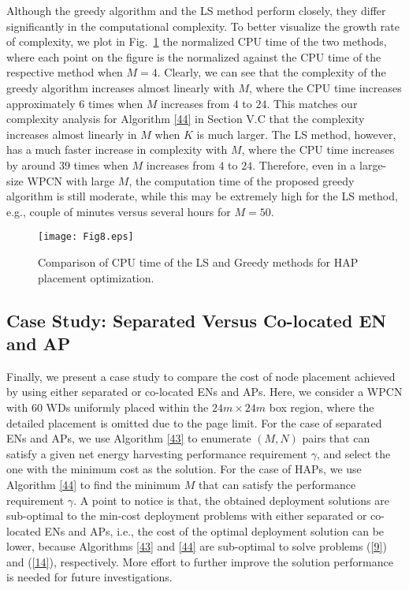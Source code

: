 \documentclass[journal, draftcls, one column, 12pt]{IEEEtran}
\begin{document}
Although the greedy algorithm and the LS method perform closely, they differ significantly in the computational complexity. To better visualize the growth rate of complexity, we plot in Fig.~\ref{70} the normalized CPU time of the two methods, where each point on the figure is the normalized against the CPU time of the respective method when $M=4$. Clearly, we can see that the complexity of the greedy algorithm increases almost linearly with $M$, where the CPU time increases approximately $6$ times when $M$ increases from $4$ to $24$. This matches our complexity analysis for Algorithm \ref{44} in Section V.C that the complexity increases almost linearly in $M$ when $K$ is much larger. The LS method, however, has a much faster increase in complexity with $M$, where the CPU time increases by around $39$ times when $M$ increases from $4$ to $24$. Therefore, even in a large-size WPCN with large $M$, the computation time of the proposed greedy algorithm is still moderate, while this may be extremely high for the LS method, e.g., couple of minutes versus several hours for $M =50$.

\begin{figure}
\centering
  \begin{center}
    \texttt{[image: Fig8.eps]}
  \end{center}
  \caption{Comparison of CPU time of the LS and Greedy methods for HAP placement optimization.}
  \label{70}
\end{figure}

\subsection{Case Study: Separated Versus Co-located EN and AP}
Finally, we present a case study to compare the cost of node placement achieved by using either separated or co-located ENs and APs. Here, we consider a WPCN with $60$ WDs uniformly placed within the $24 m \times 24 m$ box region, where the detailed placement is omitted due to the page limit. For the case of separated ENs and APs, we use Algorithm \ref{43} to enumerate $(M,N)$ pairs that can satisfy a given net energy harvesting performance requirement $\gamma$, and select the one with the minimum cost as the solution. For the case of HAPs, we use Algorithm \ref{44} to find the minimum $M$ that can satisfy the performance requirement $\gamma$. A point to notice is that, the obtained deployment solutions are sub-optimal to the min-cost deployment problems with either separated or co-located ENs and APs, i.e., the cost of the optimal deployment solution can be lower, because Algorithms \ref{43} and \ref{44} are sub-optimal to solve problems (\ref{9}) and (\ref{14}), respectively. More effort to further improve the solution performance is needed for future investigations.
\end{document}
